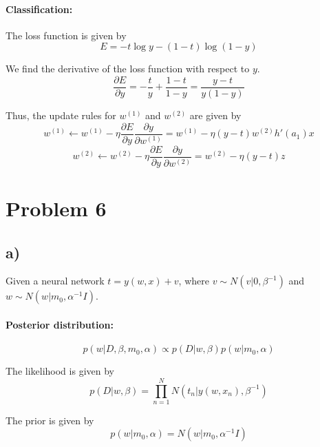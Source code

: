 \documentclass[a4paper,12pt]{article}
\newcommand{\pard}[2]{\frac{\partial #1}{\partial #2}}
\begin{document}
\paragraph{Classification:}

The loss function is given by
\begin{equation*}
	E = - t \log y - (1 - t) \log (1 - y)
\end{equation*}

We find the derivative of the loss function with respect to $y$.
\begin{equation*}
	\pard{E}{y} = - \frac{t}{y} + \frac{1 - t}{1 - y} = \frac{y - t}{y (1 - y)}
\end{equation*}

Thus, the update rules for $w^{(1)}$ and $w^{(2)}$ are given by
\begin{equation*}
	w^{(1)} \leftarrow w^{(1)} - \eta \pard{E}{y} \pard{y}{w^{(1)}} = w^{(1)} - \eta (y - t) w^{(2)} h'(a_1) x
\end{equation*}
\begin{equation*}
	w^{(2)} \leftarrow w^{(2)} - \eta \pard{E}{y} \pard{y}{w^{(2)}} = w^{(2)} - \eta (y - t) z
\end{equation*}

\section*{Problem 6}

\subsection*{a)}

Given a neural network $t = y(w, x) + v$, where $v \sim N(v|0, \beta^{-1})$ and $w \sim N(w|m_0, \alpha^{-1} I)$.

\paragraph{Posterior distribution:}

\begin{equation*}
	p(w|D, \beta, m_0, \alpha) \propto p(D|w, \beta) p(w|m_0, \alpha)
\end{equation*}

The likelihood is given by
\begin{equation*}
	p(D|w, \beta) = \prod_{n=1}^{N} N(t_n|y(w, x_n), \beta^{-1})
\end{equation*}

The prior is given by
\begin{equation*}
	p(w|m_0, \alpha) = N(w|m_0, \alpha^{-1} I)
\end{equation*}
\end{document}
